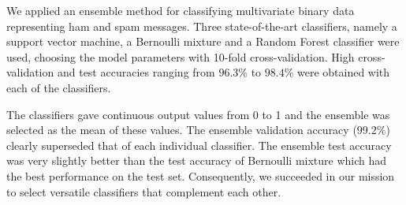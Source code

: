 We applied an ensemble method for classifying multivariate binary data
representing ham and spam messages. Three state-of-the-art classifiers,
namely a support vector machine, a Bernoulli mixture and a Random Forest
classifier were used, choosing the model parameters with 10-fold
cross-validation. High cross-validation and test accuracies ranging from
$96.3 \%$ to $98.4 \%$ were obtained with each of the classifiers.

The classifiers gave continuous output values from 0 to 1 and the
ensemble was selected as the mean of these values. The ensemble
validation accuracy ($99.2 \%$) clearly superseded that of each
individual classifier. The ensemble test accuracy was very slightly better than the test
accuracy of Bernoulli mixture which had the best performance on the test
set. Consequently, we succeeded in our mission to select versatile
classifiers that complement each other.
